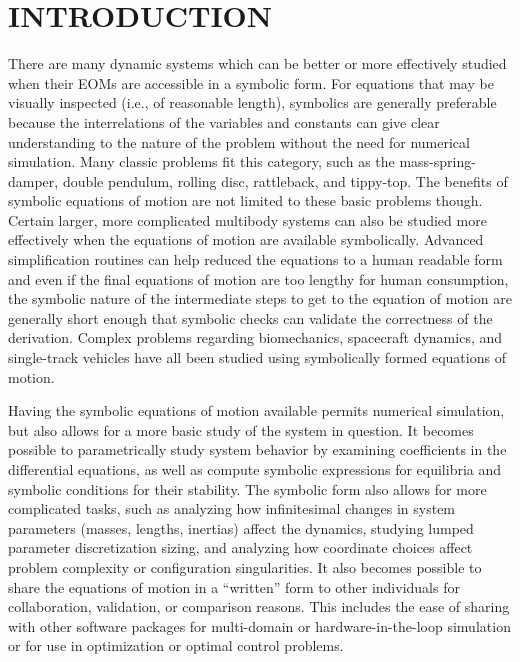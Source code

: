 \documentclass[twocolumn,10pt]{asme2e}
\begin{document}
\section*{INTRODUCTION}
There are many dynamic systems which can be better or more effectively studied
when their EOMs are accessible in a symbolic form. For equations that may be
visually inspected (i.e., of reasonable length), symbolics are generally
preferable because the interrelations of the variables and constants can give
clear understanding to the nature of the problem without the need for numerical
simulation. Many classic problems fit this category, such as the
mass-spring-damper, double pendulum, rolling disc, rattleback, and tippy-top.
The benefits of symbolic equations of motion are not limited to these basic
problems though. Certain larger, more complicated multibody systems can also be
studied more effectively when the equations of motion are available
symbolically. Advanced simplification routines can help reduced the equations
to a human readable form and even if the final equations of motion are too
lengthy for human consumption, the symbolic nature of the intermediate steps to
get to the equation of motion are generally short enough that symbolic checks
can validate the correctness of the derivation. Complex problems regarding
biomechanics, spacecraft dynamics, and single-track vehicles have all been
studied using symbolically formed equations of motion.

Having the symbolic equations of motion available permits numerical simulation,
but also allows for a more basic study of the system in question. It becomes
possible to parametrically study system behavior by examining coefficients in
the differential equations, as well as compute symbolic expressions for
equilibria and symbolic conditions for their stability. The symbolic form also
allows for more complicated tasks, such as analyzing how infinitesimal changes
in system parameters (masses, lengths, inertias) affect the dynamics, studying
lumped parameter discretization sizing, and analyzing how coordinate choices
affect problem complexity or configuration singularities. It also becomes
possible to share the equations of motion in a ``written'' form to other
individuals for collaboration, validation, or comparison reasons. This includes
the ease of sharing with other software packages for multi-domain or
hardware-in-the-loop simulation or for use in optimization or optimal control
problems.
\end{document}
